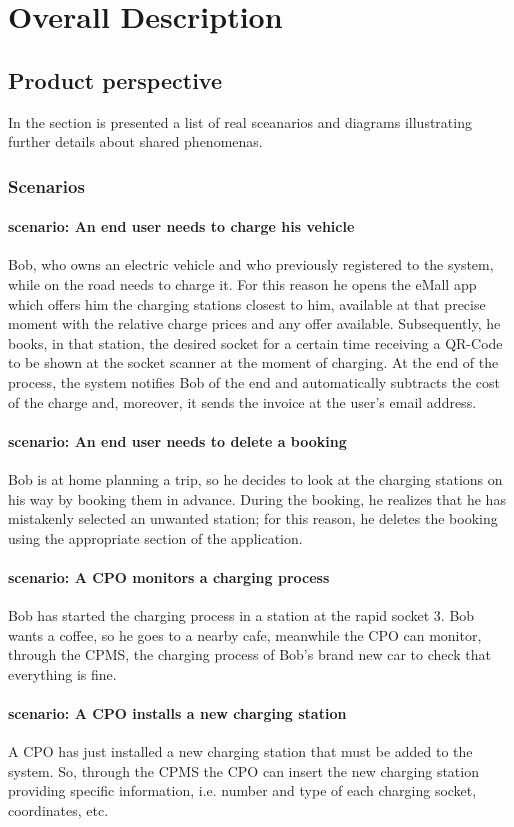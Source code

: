 \chapter{Overall Description}
\section{Product perspective}
In the section is presented a list of real sceanarios and diagrams illustrating further details about shared phenomenas.
\subsection{Scenarios}
\subsubsection{ scenario: An end user needs to charge his vehicle}
Bob, who owns an electric vehicle and who previously registered to the system, while on the road needs to charge it. For this reason he opens the eMall app which offers him the charging stations closest to him, available at that precise moment with the relative charge prices and any offer available. Subsequently, he books, in that station, the desired socket for a certain time receiving a QR-Code to be shown at the socket scanner at the moment of charging. At the end of the process, the system notifies Bob of the end and automatically subtracts the cost of the charge and, moreover, it sends the invoice at the user's email address.
\subsubsection{ scenario: An end user needs to delete a booking}
Bob is at home planning a trip, so he decides to look at the charging stations on his way by booking them in advance. During the booking, he realizes that he has mistakenly selected an unwanted station; for this reason, he deletes the booking using the appropriate section of the application.
\subsubsection{ scenario: A CPO monitors a charging process}
Bob has started the charging process in a station at the rapid socket 3. Bob wants a coffee, so he goes to a nearby cafe, meanwhile the CPO can monitor, through the CPMS, the charging process of Bob's brand new car to check that everything is fine.
\subsubsection{ scenario: A CPO installs a new charging station}
A CPO has just installed a new charging station that must be added to the system. So, through the CPMS the CPO can insert the new charging station providing specific information, i.e. number and type of each charging socket, coordinates, etc.
